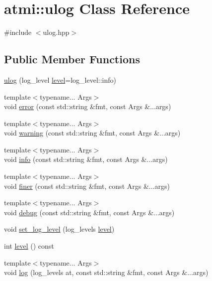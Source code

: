 \hypertarget{classatmi_1_1ulog}{\section{atmi\+:\+:ulog Class Reference}
\label{classatmi_1_1ulog}
}


{\ttfamily \#include $<$ulog.\+hpp$>$}

\subsection*{Public Member Functions}
\begin{DoxyCompactItemize}
\item 
\hyperlink{classatmi_1_1ulog_a52394015e2bcd098c9b6de0e173637e9}{ulog} (log\+\_\+level \hyperlink{classatmi_1_1ulog_a75c3bf9fdf68677f5e2b096acdac737e}{level}=log\+\_\+level\+::info)
\item 
{\footnotesize template$<$typename... Args$>$ }\\void \hyperlink{classatmi_1_1ulog_a29e7f8215085533c0b4fb788545e9329}{error} (const std\+::string \&fmt, const Args \&...args)
\item 
{\footnotesize template$<$typename... Args$>$ }\\void \hyperlink{classatmi_1_1ulog_a48f44bc3d0265fdb3b8d464b78894ccc}{warning} (const std\+::string \&fmt, const Args \&...args)
\item 
{\footnotesize template$<$typename... Args$>$ }\\void \hyperlink{classatmi_1_1ulog_a21019f39119ed09e7d71672441456787}{info} (const std\+::string \&fmt, const Args \&...args)
\item 
{\footnotesize template$<$typename... Args$>$ }\\void \hyperlink{classatmi_1_1ulog_a23b79b2222930f4363d3150c39b49992}{finer} (const std\+::string \&fmt, const Args \&...args)
\item 
{\footnotesize template$<$typename... Args$>$ }\\void \hyperlink{classatmi_1_1ulog_a96d76b04d41c2a77a4c88e5d422ea5e5}{debug} (const std\+::string \&fmt, const Args \&...args)
\item 
void \hyperlink{classatmi_1_1ulog_a190ffba6f15d00c21578051ac5c7b035}{set\+\_\+log\+\_\+level} (log\+\_\+levels \hyperlink{classatmi_1_1ulog_a75c3bf9fdf68677f5e2b096acdac737e}{level})
\item 
int \hyperlink{classatmi_1_1ulog_a75c3bf9fdf68677f5e2b096acdac737e}{level} () const 
\item 
{\footnotesize template$<$typename... Args$>$ }\\void \hyperlink{classatmi_1_1ulog_ad352992adc121dbdaf0428fd6f53125a}{log} (log\+\_\+levels at, const std\+::string \&fmt, const Args \&...args)
\end{DoxyCompactItemize}


